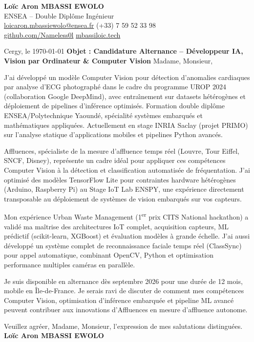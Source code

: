 \documentclass[a4paper,11pt]{article}
\begin{document}
\noindent \textbf{Lo\"ic Aron MBASSI EWOLO} \\
ENSEA -- Double Dipl\^ome Ing\'enieur \\
\href{mailto:loicaron.mbassiewolo@ensea.fr}{loicaron.mbassiewolo@ensea.fr} \quad (+33) 7 59 52 33 98 \\
\href{https://github.com/Nameless0l}{github.com/Nameless0l} \quad \href{https://mbassiloic.tech}{mbassiloic.tech}

\vspace{1em}\noindent Cergy, le \today
\vspace{1em}\noindent \textbf{Objet : Candidature Alternance -- Développeur IA, Vision par Ordinateur \& Computer Vision}
\vspace{1.5em}\noindent Madame, Monsieur,

\vspace{0.8em}\noindent J'ai d\'evelopp\'e un mod\`ele Computer Vision pour d\'etection d'anomalies cardiaques par analyse d'ECG photograph\'e dans le cadre du programme UROP 2024 (collaboration Google DeepMind), avec entra\^{\i}nement sur datasets h\'et\'erog\`enes et d\'eploiement de pipelines d'inf\'erence optimis\'es. Formation double dipl\^ome ENSEA/Polytechnique Yaound\'e, sp\'ecialit\'e syst\`emes embarqu\'es et math\'ematiques appliqu\'ees. Actuellement en stage INRIA Saclay (projet PRIMO) sur l'analyse statique d'applications mobiles et pipelines Python avanc\'es.

\vspace{0.8em}\noindent Affluences, sp\'ecialiste de la mesure d'affluence temps r\'eel (Louvre, Tour Eiffel, SNCF, Disney), repr\'esente un cadre id\'eal pour appliquer ces comp\'etences Computer Vision \`a la d\'etection et classification automatis\'ee de fr\'equentation. J'ai optimis\'e des mod\`eles TensorFlow Lite pour contraintes hardware h\'et\'erog\`enes (Arduino, Raspberry Pi) au Stage IoT Lab ENSPY, une exp\'erience directement transposable au d\'eploiement de syst\`emes de vision embarqu\'es sur vos capteurs.

\vspace{0.8em}\noindent Mon exp\'erience Urban Waste Management (1\textsuperscript{er} prix CITS National hackathon) a valid\'e ma maîtrise des architectures IoT complet, acquisition capteurs, ML pr\'edictif (scikit-learn, XGBoost) et \'evaluation mod\`eles \`a grande \'echelle. J'ai aussi d\'evelopp\'e un syst\`eme complet de reconnaissance faciale temps r\'eel (ClassSync) pour appel automatique, combinant OpenCV, Python et optimisation performance multiples cam\'eras en parall\`ele.

\vspace{0.8em}\noindent Je suis disponible en alternance d\`es septembre 2026 pour une dur\'ee de 12 mois, mobile en Île-de-France. Je serais ravi de discuter de comment mes comp\'etences Computer Vision, optimisation d'inf\'erence embarqu\'ee et pipeline ML avanc\'e peuvent contribuer aux innovations d'Affluences en mesure d'affluence autonome.

\vspace{1.5em}\noindent Veuillez agr\'eer, Madame, Monsieur, l'expression de mes salutations distingu\'ees.
\vspace{2em}\noindent \textbf{Lo\"ic Aron MBASSI EWOLO}
\end{document}
